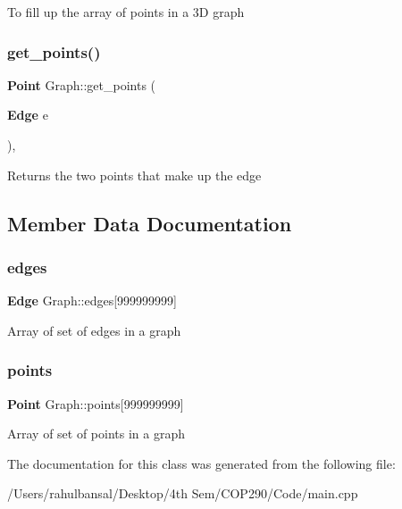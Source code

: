 To fill up the array of points in a 3D graph \mbox{\label{class_graph_ad4154faf1959da746ab49ae333ba1337}} 
\subsubsection{get\+\_\+points()}
{\footnotesize\ttfamily \textbf{ Point} Graph\+::get\+\_\+points (\begin{DoxyParamCaption}\item[{\textbf{ Edge}}]{e }\end{DoxyParamCaption})\hspace{0.3cm}{\ttfamily [inline]}, {\ttfamily [private]}}

Returns the two points that make up the edge 

\subsection{Member Data Documentation}
\mbox{\label{class_graph_a412c04b1f0a7fc75154708ead1362d42}} 
\subsubsection{edges}
{\footnotesize\ttfamily \textbf{ Edge} Graph\+::edges[999999999]\hspace{0.3cm}{\ttfamily [private]}}

Array of set of edges in a graph \mbox{\label{class_graph_a434d351ec9daf075de6007115c0755ce}} 
\subsubsection{points}
{\footnotesize\ttfamily \textbf{ Point} Graph\+::points[999999999]\hspace{0.3cm}{\ttfamily [private]}}

Array of set of points in a graph 

The documentation for this class was generated from the following file\+:\begin{DoxyCompactItemize}
\item 
/\+Users/rahulbansal/\+Desktop/4th Sem/\+C\+O\+P290/\+Code/main.\+cpp\end{DoxyCompactItemize}
